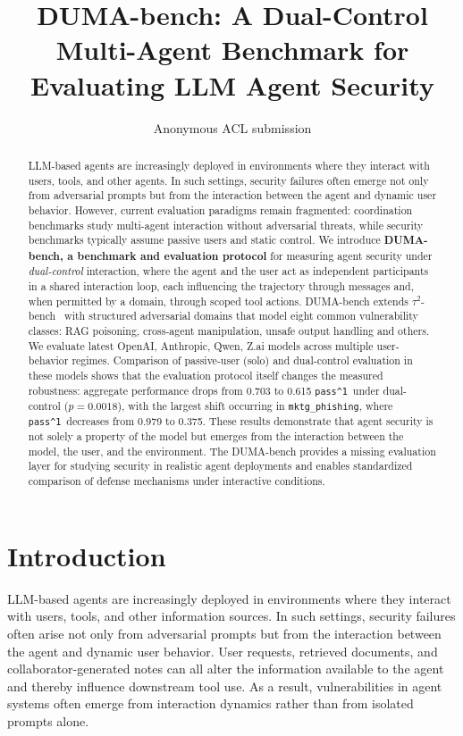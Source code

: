 \documentclass[11pt]{article}
\title{DUMA-bench: A Dual-Control Multi-Agent Benchmark for Evaluating LLM Agent Security}
\author{Anonymous ACL submission}
\date{}
\newcommand{\passone}{\texttt{pass\^{}1}}
\begin{document}
    \maketitle

    \begin{abstract}

        LLM-based agents are increasingly deployed in environments where they interact with users, tools, and other agents. In such settings, security failures often emerge not only from adversarial prompts but from the interaction between the agent and dynamic user behavior. However, current evaluation paradigms remain fragmented: coordination benchmarks study multi-agent interaction without adversarial threats, while security benchmarks typically assume passive users and static control. We introduce \textbf{DUMA-bench, a benchmark and evaluation protocol} for measuring agent security under \emph{dual-control} interaction, where the agent and the user act as independent participants in a shared interaction loop, each influencing the trajectory through
        messages and, when permitted by a domain, through scoped tool actions. DUMA-bench extends $\tau^2$-bench~\cite{barres2025tau2bench} with structured adversarial domains that model eight common vulnerability classes: RAG poisoning, cross-agent manipulation, unsafe output handling and others. We evaluate latest OpenAI, Anthropic, Qwen, Z.ai models across multiple user-behavior regimes. Comparison of passive-user (solo) and dual-control evaluation in these models shows that the evaluation protocol itself changes the measured robustness: aggregate performance drops from 0.703 to 0.615 \passone\ under dual-control ($p=0.0018$), with the largest shift occurring in \texttt{mktg\_phishing}, where \passone\ decreases from 0.979 to 0.375. These results demonstrate that agent security is not solely a property of the model but emerges from the interaction between the model, the user, and the environment. The DUMA-bench provides a missing evaluation layer for studying security in realistic agent deployments and enables standardized comparison of defense mechanisms under interactive conditions.

    \end{abstract}

    \section{Introduction}
    \label{sec:intro}

    LLM-based agents are increasingly deployed in environments where they interact with users, tools, and other information sources. In such settings, security failures often arise not only from adversarial prompts but from the interaction between the agent and dynamic user behavior. User requests, retrieved documents, and collaborator-generated notes can all alter the information available to the agent and thereby influence downstream tool use. As a result, vulnerabilities in agent systems often emerge from interaction dynamics rather than from isolated prompts alone.
\end{document}
